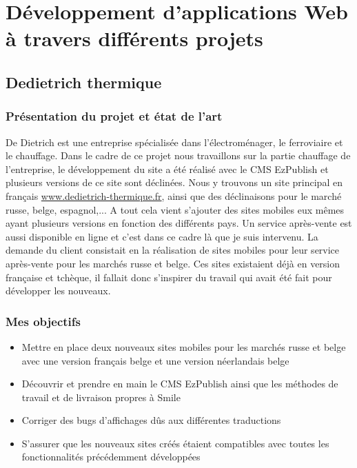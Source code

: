 \documentclass[a4paper,11pt,twoside]{report}
\begin{document}
\chapter{Développement d'applications Web à travers différents projets}
  \section{Dedietrich thermique}
    \subsection*{Présentation du projet et état de l'art}
    De Dietrich est une entreprise spécialisée dans l'électroménager, le ferroviaire et le chauffage. Dans le cadre de ce projet nous travaillons sur la partie chauffage de l'entreprise, le développement du site a été réalisé avec le CMS EzPublish et plusieurs versions de ce site sont déclinées. Nous y trouvons un site principal en français \url{www.dedietrich-thermique.fr}, ainsi que des déclinaisons pour le marché russe, belge, espagnol,... A tout cela vient s'ajouter des sites mobiles eux mêmes ayant plusieurs versions en fonction des différents pays. Un service après-vente est aussi disponible en ligne et c'est dans ce cadre là que je suis intervenu. La demande du client consistait en la réalisation de sites mobiles pour leur service après-vente pour les marchés russe et belge. Ces sites existaient déjà en version française et tchèque, il fallait donc s'inspirer du travail qui avait été fait pour développer les nouveaux. 
    \subsection*{Mes objectifs}
      \begin{itemize}

	\item Mettre en place deux nouveaux sites mobiles pour les marchés russe et belge avec une version français belge et une version néerlandais belge
	\item Découvrir et prendre en main le CMS EzPublish ainsi que les méthodes de travail et de livraison propres à Smile
	\item Corriger des bugs d'affichages dûs aux différentes traductions
	\item S'assurer que les nouveaux sites créés étaient compatibles avec toutes les fonctionnalités précédemment développées

      \end{itemize}
\end{document}
